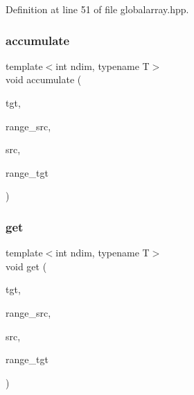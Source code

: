 Definition at line 51 of file globalarray.\+hpp.

\hypertarget{classshark_1_1ndim_1_1_global_array_aa95eda1df3e42435fbeddc71a7bebeb9}{}\label{classshark_1_1ndim_1_1_global_array_aa95eda1df3e42435fbeddc71a7bebeb9} 
\subsubsection{\texorpdfstring{accumulate}{accumulate}}
{\footnotesize\ttfamily template$<$int ndim, typename T$>$ \\
void accumulate (\begin{DoxyParamCaption}\item[{\hyperlink{classshark_1_1ndim_1_1_global_array}{Global\+Array}$<$ ndim, T $>$ \&}]{tgt,  }\item[{\hyperlink{structshark_1_1ndim_1_1coords__range}{coords\+\_\+range}$<$ ndim $>$}]{range\+\_\+src,  }\item[{\hyperlink{classshark_1_1ndim_1_1_global_array}{Global\+Array}$<$ ndim, T $>$ \&}]{src,  }\item[{\hyperlink{structshark_1_1ndim_1_1coords__range}{coords\+\_\+range}$<$ ndim $>$}]{range\+\_\+tgt }\end{DoxyParamCaption})\hspace{0.3cm}{\ttfamily [friend]}}

\hypertarget{classshark_1_1ndim_1_1_global_array_a2f0f1152d3993384631952178a21f82e}{}\label{classshark_1_1ndim_1_1_global_array_a2f0f1152d3993384631952178a21f82e} 
\subsubsection{\texorpdfstring{get}{get}}
{\footnotesize\ttfamily template$<$int ndim, typename T$>$ \\
void get (\begin{DoxyParamCaption}\item[{\hyperlink{classshark_1_1ndim_1_1_global_array}{Global\+Array}$<$ ndim, T $>$ \&}]{tgt,  }\item[{\hyperlink{structshark_1_1ndim_1_1coords__range}{coords\+\_\+range}$<$ ndim $>$}]{range\+\_\+src,  }\item[{\hyperlink{classshark_1_1ndim_1_1_global_array}{Global\+Array}$<$ ndim, T $>$ \&}]{src,  }\item[{\hyperlink{structshark_1_1ndim_1_1coords__range}{coords\+\_\+range}$<$ ndim $>$}]{range\+\_\+tgt }\end{DoxyParamCaption})\hspace{0.3cm}{\ttfamily [friend]}}

